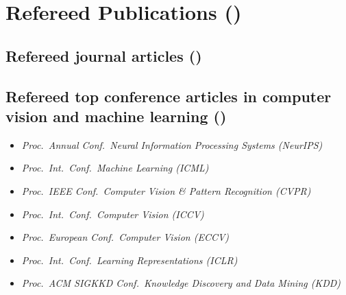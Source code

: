 \documentclass[9pt, a4paper]{article}
\begin{document}


\section*{Refereed Publications (\unskip)}

\subsection*{Refereed journal articles (\unskip)}
\noindent








\vspace{-0.15cm}
\subsection*{Refereed top conference articles in computer vision and machine learning (\unskip)
}
{
\begin{itemize}
  \itemsep -.12cm
\footnotesize
\item \emph{  Proc.\ Annual Conf.\ Neural Information Processing Systems (NeurIPS)}
\item \emph{  Proc.\ Int.\ Conf.\ Machine Learning (ICML)}
\item \emph{  Proc.\ IEEE Conf.\ Computer Vision \& Pattern Recognition (CVPR)}
\item \emph{  Proc.\ Int.\ Conf.\ Computer  Vision (ICCV)}
\item \emph{  Proc.\ European Conf.\ Computer Vision (ECCV)}
\item \emph{  Proc.\ Int.\ Conf.\ Learning Representations (ICLR)}
\item \emph{  Proc.\ ACM SIGKKD Conf.\   Knowledge Discovery and Data Mining (KDD)}
\end{itemize}
}


\noindent









\vspace{-0.15cm}
\end{document}

